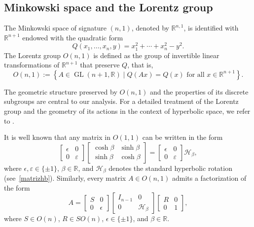 \documentclass[]{article}
\begin{document}
\subsection*{Minkowski space and the Lorentz group}

The Minkowski space of signature \((n,1)\), denoted by \(\mathbb{R}^{n,1}\), is identified with \(\mathbb{R}^{n+1}\) endowed with the quadratic form
\[
Q(x_1, \dots, x_n, y) = x_1^2 + \cdots + x_n^2 - y^2.
\]
The Lorentz group \(O(n,1)\) is defined as the group of invertible linear transformations of \(\mathbb{R}^{n+1}\) that preserve \(Q\), that is,
\[
O(n,1) := \left\{A \in \operatorname{GL}(n+1,\mathbb{R}) \mid Q(Ax) = Q(x) \text{ for all } x \in \mathbb{R}^{n+1} \right\}.
\]

The geometric structure preserved by \(O(n,1)\) and the properties of its discrete subgroups are central to our analysis. For a detailed treatment of the Lorentz group and the geometry of its actions in the context of hyperbolic space, we refer to \cite{ratcliffe2019}.

It is well known that any matrix in $O(1,1)$ can be written in the form
$$
\begin{bmatrix}
	\epsilon & 0 \\
	0 & \varepsilon
\end{bmatrix}
\begin{bmatrix}
	\cosh \beta & \sinh \beta \\
	\sinh \beta & \cosh \beta
\end{bmatrix}
=
\begin{bmatrix}
	\epsilon & 0 \\
	0 & \varepsilon
\end{bmatrix} \mathcal{H}_\beta,
$$
where $\epsilon, \varepsilon \in \{\pm1\}$, $\beta \in \mathbb{R}$, and $\mathcal{H}_\beta$ denotes the standard hyperbolic rotation (see~\eqref{matrizhb}). Similarly, every matrix $A \in O(n,1)$ admits a factorization of the form
$$
A =
\begin{bmatrix}
	S & 0 \\
	0 & \epsilon
\end{bmatrix}
\begin{bmatrix}
	I_{n-1} & 0 \\
	0 & \mathcal{H}_\beta
\end{bmatrix}
\begin{bmatrix}
	R & 0 \\
	0 & 1
\end{bmatrix},
$$
where $S \in O(n)$, $R \in SO(n)$, $\epsilon \in \{\pm1\}$, and $\beta \in \mathbb{R}$.
\end{document}
